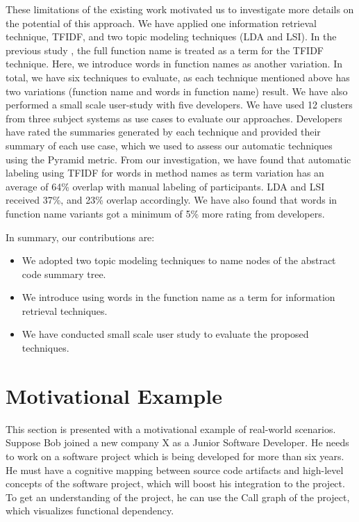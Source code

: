 These limitations of the existing work motivated us to investigate more details on the potential of this approach. We have applied one information retrieval technique, TFIDF, and two topic modeling techniques (LDA and LSI). In the previous study \cite{gharibi2018automatic}, the full function name is treated as a term for the TFIDF technique. Here, we introduce words in function names as another variation. In total, we have six techniques to evaluate, as each technique mentioned above has two variations (function name and words in function name) result. We have also performed a small scale user-study with five developers. We have used 12 clusters from three subject systems as use cases to evaluate our approaches. Developers have rated the summaries generated by each technique and provided their summary of each use case, which we used to assess our automatic techniques using the Pyramid metric. From our investigation, we have found that automatic labeling using TFIDF for words in method names as term variation has an average of 64\% overlap with manual labeling of participants. LDA and LSI received 37\%, and 23\% overlap accordingly. We have also found that words in function name variants got a minimum of 5\% more rating from developers.

In summary, our contributions are:
\begin{itemize}
  \item We adopted two topic modeling techniques to name nodes of the abstract code summary tree. 
  \item We introduce using words in the function name as a term for information retrieval techniques.
  \item We have conducted small scale user study to evaluate the proposed techniques.
\end{itemize}



\section{Motivational Example}
\label{motive}

This section is presented with a motivational example of real-world scenarios. Suppose Bob joined a new company X as a Junior Software Developer. He needs to work on a software project which is being developed for more than six years. He must have a cognitive mapping between source code artifacts and high-level concepts of the software project, which will boost his integration to the project. To get an understanding of the project, he can use the Call graph of the project, which visualizes functional dependency.

